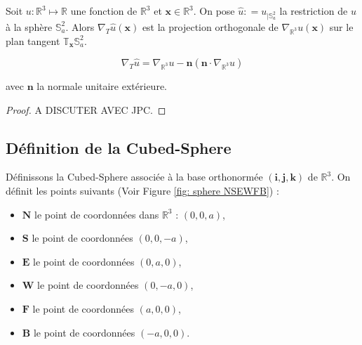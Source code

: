 \begin{proposition}
Soit $u: \mathbb{R}^3 \mapsto \mathbb{R}$ une fonction de $\mathbb{R}^3$ et $\mathbf{x} \in \mathbb{R}^3$. On pose $\hat{u} : = u_{|\mathbb{S}_a^2}$ la restriction de $u$ à la sphère $\mathbb{S}_a^2$. Alors $\nabla_{T} \hat{u} (\mathbf{x})$ est la projection orthogonale de $\nabla_{\mathbb{R}^3} u (\mathbf{x})$ sur le plan tangent $\mathbb{T}_{\mathbf{x}} \mathbb{S}_a^2$.

\begin{equation}
\nabla_T \hat{u} = \nabla_{\mathbb{R}^3} u - \mathbf{n} \left( \mathbf{n} \cdot \nabla_{\mathbb{R}^3} u \right)
\end{equation}

avec $\mathbf{n}$ la normale unitaire extérieure.
\end{proposition}

\begin{proof}
A DISCUTER AVEC JPC.
\end{proof}



\subsection{Définition de la Cubed-Sphere}

Définissons la Cubed-Sphere associée à la base orthonormée $(\mathbf{i}, \mathbf{j}, \mathbf{k})$ de $\mathbb{R}^3$.
On définit les points suivants (Voir Figure \ref{fig: sphere NSEWFB}) :
\begin{itemize}
\item $\mathbf{N}$ le point de coordonnées dans $\mathbb{R}^3$ : $(0,0,a)$,
\item $\mathbf{S}$ le point de coordonnées $(0,0,-a)$,
\item $\mathbf{E}$ le point de coordonnées $(0,a,0)$,
\item $\mathbf{W}$ le point de coordonnées $(0,-a,0)$,
\item $\mathbf{F}$ le point de coordonnées $(a,0,0)$,
\item $\mathbf{B}$ le point de coordonnées $(-a,0,0)$.
\end{itemize}


